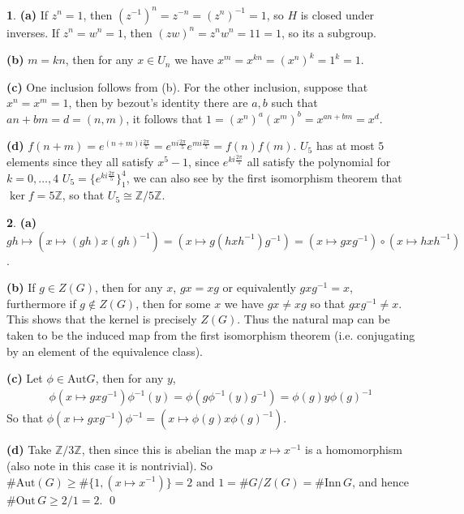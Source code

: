 \documentclass[10.5pt]{article}
\theoremstyle{definition}
\newtheorem{pb}{}
\newcommand{\set}[1]{\{#1\}}
\newcommand{\tand}{\text{ and }}
\begin{document}
    \begin{pb}
        \textbf{(a)} If \(z^n = 1\), then \((z^{-1})^n = z^{-n} = (z^n)^{-1} = 1\), so \(H\) is closed under inverses. If \(z^n = w^n = 1\), then \((zw)^n = z^n w^n = 11 = 1\), so its a subgroup.

        \textbf{(b)} \(m = kn\), then for any \(x \in U_n\) we have \(x^m = x^{kn} = (x^n)^k = 1^k = 1\).

        \textbf{(c)} One inclusion follows from (b). For the other inclusion, suppose that \(x^n = x^m = 1\), then by bezout's identity there are \(a,b\) such that \(an + bm = d = (n,m)\), it follows that \(1 = (x^{n})^a(x^m)^b = x^{an + bm} = x^d\).

        \textbf{(d)} \(f(n+m) = e^{(n + m) i\frac{2\pi}{5}} = e^{n i\frac{2\pi}{5}}e^{m i\frac{2\pi}{5}} = f(n)f(m)\). \(U_5\) has at most \(5\) elements since they all satisfy \(x^5 - 1\), since \(e^{ki\frac{2\pi}{5}}\) all satisfy the polynomial for \(k=0,\hdots,4\) \(U_5 = \set{e^{ki\frac{2\pi}{5}}}_1^4\), we can also see by the first isomorphism theorem that \(\ker f = 5 \mathbb{Z}\), so that \(U_5 \cong \mathbb{Z}/5 \mathbb{Z}\).
    \end{pb}
    \begin{pb}
        \textbf{(a)} \(gh \mapsto (x \mapsto (gh)x(gh)^{-1}) = (x \mapsto g(hxh^{-1})g^{-1}) = (x \mapsto gxg^{-1})\circ(x \mapsto hxh^{-1})\).

        \textbf{(b)} If \(g \in Z(G)\), then for any \(x\), \(gx = xg\) or equivalently \(gxg^{-1} = x\), furthermore if \(g \not \in Z(G)\), then for some \(x\) we have \(gx \neq xg\) so that \(gxg^{-1} \neq x\). This shows that the kernel is precisely \(Z(G)\). Thus the natural map can be taken to be the induced map from the first isomorphism theorem (i.e. conjugating by an element of the equivalence class).

        \textbf{(c)} Let \(\phi \in \text{Aut} G\), then for any \(y\),
        \begin{align*}
            \phi(x \mapsto gxg^{-1})\phi^{-1}(y) = \phi(g\phi^{-1}(y)g^{-1}) = \phi(g)y\phi(g)^{-1}
        \end{align*}
        So that \(\phi(x \mapsto gxg^{-1})\phi^{-1} = (x \mapsto \phi(g)x\phi(g)^{-1})\).

        \textbf{(d)} Take \(\mathbb{Z}/3 \mathbb{Z}\), then since this is abelian the map \(x \mapsto x^{-1}\) is a homomorphism (also note in this case it is nontrivial). So \(\# \text{Aut}(G) \geq \# \set{1, (x \mapsto x^{-1})} = 2 \tand 1 =  \# G/Z(G) = \# \text{Inn}\,G\), and hence \(\# \text{Out}\,G \geq 2/1 = 2\). \qed
    \end{pb}
\end{document}
